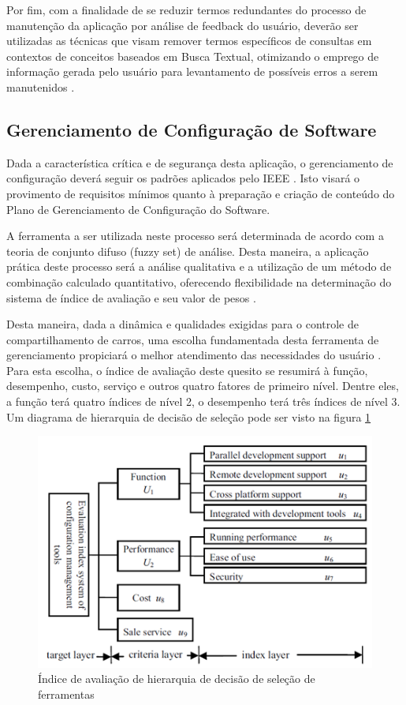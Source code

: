 \documentclass[12pt]{article}
\begin{document}
Por fim, com a finalidade de se reduzir termos redundantes do processo de manutenção da aplicação por análise de feedback do usuário, deverão ser utilizadas as técnicas que visam remover termos específicos de consultas em contextos de conceitos baseados em Busca Textual, otimizando o emprego de informação gerada pelo usuário para levantamento de possíveis erros a serem manutenidos \cite{Chaparro2016}.

\subsection{Gerenciamento de Configuração de Software}

Dada a característica crítica e de segurança desta aplicação, o gerenciamento de configuração deverá seguir os padrões aplicados pelo IEEE \cite{Patil2016}. Isto visará o provimento de requisitos mínimos quanto à preparação e criação de conteúdo do Plano de Gerenciamento de Configuração do Software.

A ferramenta a ser utilizada neste processo será determinada de acordo com a teoria de conjunto difuso (fuzzy set) de análise. Desta maneira, a aplicação prática deste processo será a análise qualitativa e a utilização de um método de combinação calculado quantitativo, oferecendo flexibilidade na determinação do sistema de índice de avaliação e seu valor de pesos \cite{Ren2010}.

Desta maneira, dada a dinâmica e qualidades exigidas para o controle de compartilhamento de carros, uma escolha fundamentada desta ferramenta de gerenciamento propiciará o melhor atendimento das necessidades do  usuário \cite{Ren2010}. Para esta escolha, o índice de avaliação deste quesito se resumirá à função, desempenho, custo, serviço e outros quatro fatores de primeiro nível. Dentre eles, a função terá quatro índices de nível 2, o desempenho terá três índices de nível 3. Um diagrama de hierarquia de decisão de seleção pode ser visto na figura \ref{fig:exampleFig3}

\begin{figure}[htp]
\centering
\includegraphics[scale=.8] {swebok_configuration.png}
\caption{Índice de avaliação de hierarquia de decisão de seleção de ferramentas}
\label{fig:exampleFig3}
\end{figure}
\end{document}
